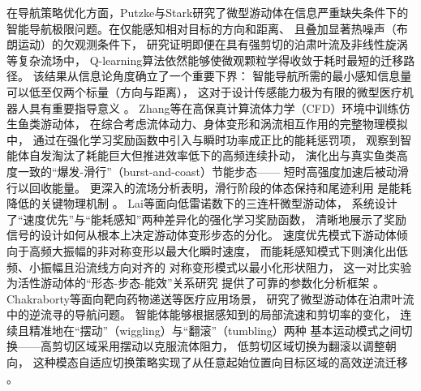在导航策略优化方面，Putzke与Stark研究了微型游动体在信息严重缺失条件下的
智能导航极限问题。在仅能感知相对目标的方向和距离、
且叠加显著热噪声（布朗运动）的欠观测条件下，
研究证明即便在具有强剪切的泊肃叶流及非线性旋涡等复杂流场中，
Q-learning算法依然能够使微观颗粒学得收敛于耗时最短的迁移路径。
该结果从信息论角度确立了一个重要下界：
智能导航所需的最小感知信息量可以低至仅两个标量（方向与距离），
这对于设计传感能力极为有限的微型医疗机器人具有重要指导意义
\cite{putzkeOptimalNavigationSmart2023}。
Zhang等在高保真计算流体力学（CFD）环境中训练仿生鱼类游动体，
在综合考虑流体动力、身体变形和涡流相互作用的完整物理模拟中，
通过在强化学习奖励函数中引入与瞬时功率成正比的能耗惩罚项，
观察到智能体自发淘汰了耗能巨大但推进效率低下的高频连续扑动，
演化出与真实鱼类高度一致的“爆发-滑行”（burst-and-coast）节能步态——
短时高强度加速后被动滑行以回收能量。
更深入的流场分析表明，滑行阶段的体态保持和尾迹利用
是能耗降低的关键物理机制
\cite{zhangReinforcementLearningRobust2025}。
Lai等面向低雷诺数下的三连杆微型游动体，
系统设计了“速度优先”与“能耗感知”两种差异化的强化学习奖励函数，
清晰地展示了奖励信号的设计如何从根本上决定游动体变形步态的分化。
速度优先模式下游动体倾向于高频大振幅的非对称变形以最大化瞬时速度，
而能耗感知模式下则演化出低频、小振幅且沿流线方向对齐的
对称变形模式以最小化形状阻力，
这一对比实验为活性游动体的“形态-步态-能效”关系研究
提供了可靠的参数化分析框架
\cite{laiNavigationThreeLinkMicroswimmer2025}。
Chakraborty等面向靶向药物递送等医疗应用场景，
研究了微型游动体在泊肃叶流中的逆流寻的导航问题。
智能体能够根据感知到的局部流速和剪切率的变化，
连续且精准地在“摆动”（wiggling）与“翻滚”（tumbling）两种
基本运动模式之间切换——高剪切区域采用摆动以克服流体阻力，
低剪切区域切换为翻滚以调整朝向，
这种模态自适应切换策略实现了从任意起始位置向目标区域的高效逆流迁移
\cite{chakrabortySmartNavigationMicroswimmers2025}。


